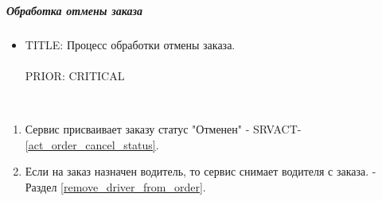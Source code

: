 \subparagraph{Обработка отмены заказа}

  \begin{itemize}

    \item {
      TITLE: Процесс обработки отмены заказа.\\
      \\
      PRIOR: CRITICAL\\
    }

  \end{itemize}

  \begin{alg}\label{cancel_order_alg} \mbox{}\\

    \begin{enumerate}

      \item Сервис присваивает заказу статус "Отменен" - SRVACT-\ref{act_order_cancel_status}.

      \item Если на заказ назначен водитель, то сервис снимает водителя с заказа. - Раздел \ref{remove_driver_from_order}.

    \end{enumerate}

  \end{alg}